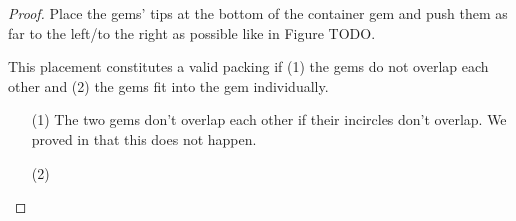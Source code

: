 \begin{proof}
    Place the gems' tips at the bottom of the container gem and push them as far to the left/to the right as possible like in Figure TODO.

    This placement constitutes a valid packing if (1) the gems do not overlap each other and (2) the gems fit into the gem individually.

    \begin{itemize}
        \item[(1)]
            The two gems don't overlap each other if their incircles don't overlap. We proved in  that this does not happen.
        \item[(2)]

    \end{itemize}
\end{proof}

